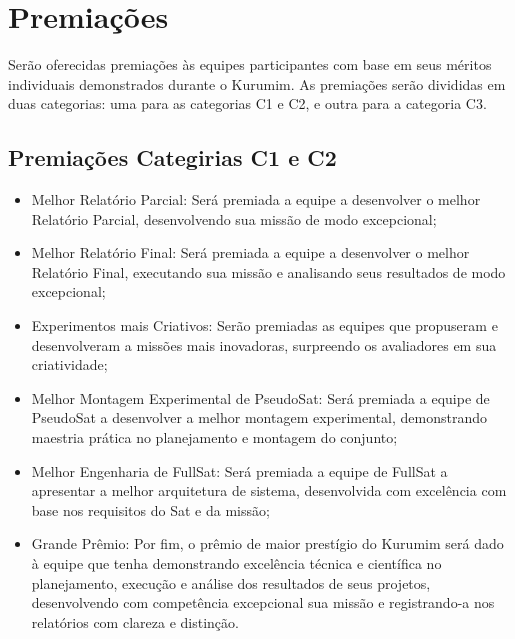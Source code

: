 \section{Premiações}
    \par Serão oferecidas premiações às equipes participantes com base em seus 
    méritos individuais demonstrados durante o Kurumim. As premiações serão divididas
    em duas categorias: uma para as categorias C1 e C2, e outra para a categoria C3.
    
    
    \subsection{Premiações Categirias C1 e C2}

        \begin{itemize}
            \item Melhor Relatório Parcial: Será premiada a equipe a desenvolver o 
            melhor Relatório Parcial, desenvolvendo sua missão de modo excepcional;
            \item Melhor Relatório Final: Será premiada a equipe a desenvolver o melhor 
            Relatório Final, executando sua missão e analisando seus resultados de modo 
            excepcional;
            \item Experimentos mais Criativos: Serão premiadas as equipes que propuseram 
            e desenvolveram a missões mais inovadoras, surpreendo os avaliadores em sua 
            criatividade;
            \item Melhor Montagem Experimental de PseudoSat: Será premiada a equipe de 
            PseudoSat a desenvolver a melhor montagem experimental, demonstrando maestria
            prática no planejamento e montagem do conjunto;
            \item Melhor Engenharia de FullSat: Será premiada a equipe de FullSat a 
            apresentar a melhor arquitetura de sistema, desenvolvida com excelência com 
            base nos requisitos do Sat e da missão;
            \item Grande Prêmio: Por fim, o prêmio de maior prestígio do Kurumim será 
            dado à equipe que tenha demonstrando excelência técnica e científica no 
            planejamento, execução e análise dos resultados de seus projetos, desenvolvendo
            com competência excepcional sua missão e registrando-a nos relatórios com 
            clareza e distinção. 
        \end{itemize}


